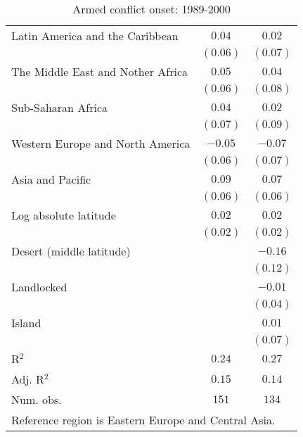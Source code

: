 \begin{table}[H]
\begin{center}
{\begin{tabular}{l c c}
Latin America and the Caribbean   & $0.04$      & $0.02$         \\
                                  & $(0.06)$    & $(0.07)$       \\
The Middle East and Nother Africa & $0.05$      & $0.04$         \\
                                  & $(0.06)$    & $(0.08)$       \\
Sub-Saharan Africa                & $0.04$      & $0.02$         \\
                                  & $(0.07)$    & $(0.09)$       \\
Western Europe and North America  & $-0.05$     & $-0.07$        \\
                                  & $(0.06)$    & $(0.07)$       \\
Asia and Pacific                  & $0.09$      & $0.07$         \\
                                  & $(0.06)$    & $(0.06)$       \\
Log absolute latitude             & $0.02$      & $0.02$         \\
                                  & $(0.02)$    & $(0.02)$       \\
Desert (middle latitude)          &             & $-0.16$        \\
                                  &             & $(0.12)$       \\
Landlocked                        &             & $-0.01$        \\
                                  &             & $(0.04)$       \\
Island                            &             & $0.01$         \\
                                  &             & $(0.07)$       \\
\hline
R$^2$                             & $0.24$      & $0.27$         \\
Adj. R$^2$                        & $0.15$      & $0.14$         \\
Num. obs.                         & $151$       & $134$          \\
\hline
\multicolumn{3}{l}{\scriptsize{Reference region is Eastern Europe and Central Asia.}}
\end{tabular}
}
\caption{Armed conflict onset: 1989-2000}
\label{onset89-20}
\end{center}
\end{table}
